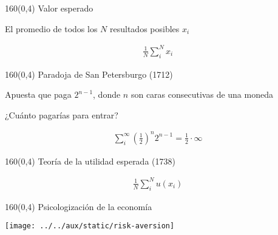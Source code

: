 \documentclass[shownotes,aspectratio=169]{beamer}
\begin{document}
\begin{frame}[plain]
 \begin{textblock}{160}(0,4)
  \centering \Large Valor esperado
 \end{textblock}
 \vspace{1cm}
 
 \centering
 El promedio de todos los $N$ resultados posibles $x_i$ 
 
 \begin{align*}
  \frac{1}{N} \sum_i^N x_i
 \end{align*}

 
\end{frame}

\begin{frame}[plain]
 \begin{textblock}{160}(0,4)
  \centering \Large Paradoja de San Petersburgo (1712)
 \end{textblock}
 \vspace{1cm}

 \centering
 Apuesta que paga $2^{n-1}$, donde $n$ son caras consecutivas de una moneda

 \vspace{0.5cm}
 
 ¿Cuánto pagarías para entrar?
 
 \pause
 \begin{align*}
 \sum_i^{\infty} \left(\frac{1}{2} \right)^n 2^{n-1} = \frac{1}{2} \cdot \infty
 \end{align*}
 
\end{frame}

\begin{frame}[plain]
 \begin{textblock}{160}(0,4)
  \centering \Large Teoría de la utilidad esperada (1738)
 \end{textblock}


 \begin{align*}
  \frac{1}{N} \sum_i^N u(x_i)
 \end{align*}
 
 \end{frame}

 

 
 \begin{frame}[plain]
 \begin{textblock}{160}(0,4)
  \centering \Large Psicologización de la economía
\end{textblock}
\centering
\vspace{1cm}
 
\texttt{[image: ../../aux/static/risk-aversion]}

 \end{frame}
\end{document}
